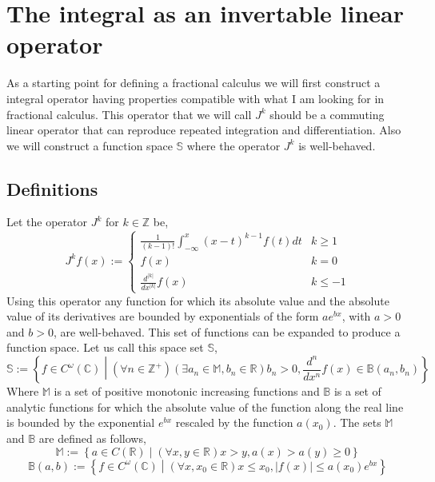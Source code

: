 \documentclass[%
 onecolumn,
 amsmath, amssymb, aps, pra, 10pt
]{revtex4-2}
\begin{document}
\clearpage

\appendix*
\section{The integral as an invertable linear operator}
As a starting point for defining a fractional calculus we will first construct a integral operator having properties compatible with what I am looking for in fractional calculus. This operator that we will call $J^k$ should be a commuting linear operator that can reproduce repeated integration and differentiation. Also we will construct a function space $\mathbb{S}$ where the operator $J^k$ is well-behaved.

\subsection{Definitions}
Let the operator $J^k$ for $k \in \mathbb{Z}$ be,
\begin{equation}
J^k f(x) := \begin{cases} \frac{1}{(k-1)!}\int_{-\infty}^x (x - t)^{k - 1}f(t)dt & k \geq 1 \\ f(x) & k = 0 \\ \frac{d^{\left|k\right|}}{dx^{\left|k\right|}}f(x) & k \leq -1 \end{cases}
\label{integer_calculus}
\end{equation}
Using this operator any function for which its absolute value and the absolute value of its derivatives are bounded by exponentials of the form $ae^{bx}$, with $a > 0$ and $b > 0$, are well-behaved. This set of functions can be expanded to produce a function space. Let us call this space set $\mathbb{S}$,
\begin{equation}
\mathbb{S} := \left\lbrace f \in C^\omega(\mathbb{C}) \middle| (\forall n \in \mathbb{Z}^+)(\exists a_n \in \mathbb{M}, b_n \in \mathbb{R}) b_n > 0, \frac{d^n}{dx^n}f(x) \in \mathbb{B}(a_n, b_n) \right\rbrace
\label{exponentialy_bounded}
\end{equation}
Where $\mathbb{M}$ is a set of positive monotonic increasing functions and $\mathbb{B}$ is a set of analytic functions for which the absolute value of the function along the real line is bounded by the exponential $e^{bx}$ rescaled by the function $a(x_0)$. The sets $\mathbb{M}$ and $\mathbb{B}$ are defined as follows,
\[\mathbb{M} := \left\lbrace a \in C(\mathbb{R}) \middle| (\forall x, y \in \mathbb{R}) x > y, a(x) > a(y) \geq 0 \right\rbrace\]
\[\mathbb{B}(a, b) := \left\lbrace f \in C^\omega(\mathbb{C}) \middle| (\forall x, x_0 \in \mathbb{R}) x \leq x_0, |f(x)| \leq a(x_0)e^{bx} \right\rbrace\]
\end{document}
